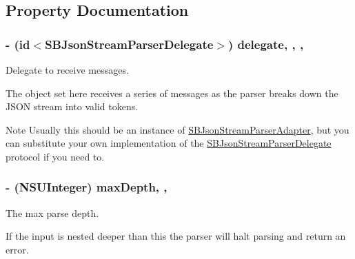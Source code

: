 \subsection{Property Documentation}
\hypertarget{interface_s_b_json_stream_parser_a1a4e90ce1ca9b55e7696db77ef6bf20c}{
\subsubsection[{delegate}]{\setlength{\rightskip}{0pt plus 5cm}-\/ (id$<${\bf S\-B\-Json\-Stream\-Parser\-Delegate}$>$) delegate\hspace{0.3cm}{\ttfamily [read]}, {\ttfamily [write]}, {\ttfamily [atomic]}, {\ttfamily [assign]}}}\label{interface_s_b_json_stream_parser_a1a4e90ce1ca9b55e7696db77ef6bf20c}


Delegate to receive messages. 

The object set here receives a series of messages as the parser breaks down the J\-S\-O\-N stream into valid tokens.

\begin{DoxyNote}{Note}
Usually this should be an instance of \hyperlink{interface_s_b_json_stream_parser_adapter}{S\-B\-Json\-Stream\-Parser\-Adapter}, but you can substitute your own implementation of the \hyperlink{protocol_s_b_json_stream_parser_delegate-p}{S\-B\-Json\-Stream\-Parser\-Delegate} protocol if you need to. 
\end{DoxyNote}
\hypertarget{interface_s_b_json_stream_parser_a1c6f49cb5dd676452994d96498bb5a3f}{
\subsubsection[{max\-Depth}]{\setlength{\rightskip}{0pt plus 5cm}-\/ (N\-S\-U\-Integer) max\-Depth\hspace{0.3cm}{\ttfamily [read]}, {\ttfamily [write]}, {\ttfamily [atomic]}}}\label{interface_s_b_json_stream_parser_a1c6f49cb5dd676452994d96498bb5a3f}


The max parse depth. 

If the input is nested deeper than this the parser will halt parsing and return an error.

